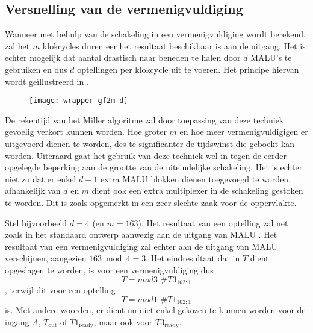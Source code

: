 
\subsection{Versnelling van de vermenigvuldiging}\label{subsectie-implementatie-gf2m-versnelling}

Wanneer met behulp van de schakeling in  een vermenigvuldiging wordt berekend, zal het $m$ klokcycles duren eer het resultaat beschikbaar is aan de uitgang. Het is echter mogelijk dat aantal drastisch naar beneden te halen door $d$ MALU's te gebruiken en dus $d$ optellingen per klokcycle uit te voeren. Het principe hiervan wordt ge\"illustreerd in .

\begin{figure}[h]
	\begin{center}
		\texttt{[image: wrapper-gf2m-d]}
		\label{figuur-implementatie-wrapper-gf2m-d}
	\end{center}
\end{figure}

De rekentijd van het Miller algoritme zal door toepassing van deze techniek gevoelig verkort kunnen worden. Hoe groter $m$ en hoe meer vermenigvuldigigen er uitgevoerd dienen te worden, des te significanter de tijdswinst die geboekt kan worden. Uiteraard gaat het gebruik van deze techniek wel in tegen de eerder opgelegde beperking aan de grootte van de uiteindelijke schakeling. Het is echter niet zo dat er enkel $d - 1$ extra MALU blokken dienen toegevoegd te worden, afhankelijk van $d$ en $m$ dient ook een extra multiplexer in de schakeling gestoken te worden. Dit is zoals opgemerkt in  een zeer slechte zaak voor de  oppervlakte.

Stel bijvoorbeeld $d = 4$ (en $m = 	163$). Het resultaat van een optelling zal net zoals in het standaard ontwerp aanwezig aan de uitgang van MALU . Het resultaat van een vermenigvuldiging zal echter aan de uitgang van MALU  verschijnen, aangezien $163 \bmod 4 = 3$. Het eindresultaat dat in $T$ dient opgeslagen te worden, is voor een vermenigvuldiging dus
\[T = mod3 \text{ \# } T3_{162:1}\]
, terwijl dit voor een optelling
\[T = mod1 \text{ \# } T1_{162:1}\]
is. Met andere woorden, er dient nu niet enkel gekozen te kunnen worden voor de ingang $A$, $T_{\text{out}}$ of $T1_{\text{ready}}$, maar ook voor $T3_{\text{ready}}$.

